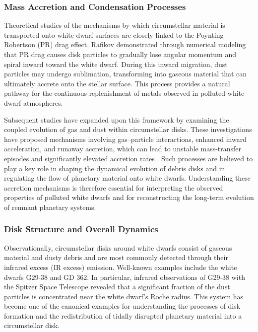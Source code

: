 \subsubsection{Mass Accretion and Condensation Processes}

Theoretical studies of the mechanisms by which circumstellar material is transported onto white dwarf surfaces are closely linked to the Poynting--Robertson (PR) drag effect. Rafikov \cite{rafikov2011} demonstrated through numerical modeling that PR drag causes disk particles to gradually lose angular momentum and spiral inward toward the white dwarf. During this inward migration, dust particles may undergo sublimation, transforming into gaseous material that can ultimately accrete onto the stellar surface. This process provides a natural pathway for the continuous replenishment of metals observed in polluted white dwarf atmospheres.

Subsequent studies have expanded upon this framework by examining the coupled evolution of gas and dust within circumstellar disks. These investigations have proposed mechanisms involving gas--particle interactions, enhanced inward acceleration, and runaway accretion, which can lead to unstable mass-transfer episodes and significantly elevated accretion rates \cite{rafikov2011}. Such processes are believed to play a key role in shaping the dynamical evolution of debris disks and in regulating the flow of planetary material onto white dwarfs. Understanding these accretion mechanisms is therefore essential for interpreting the observed properties of polluted white dwarfs and for reconstructing the long-term evolution of remnant planetary systems.

\subsubsection{Disk Structure and Overall Dynamics}

Observationally, circumstellar disks around white dwarfs consist of gaseous material and dusty debris and are most commonly detected through their infrared excess (IR excess) emission. Well-known examples include the white dwarfs G29-38 and GD 362. In particular, infrared observations of G29-38 with the Spitzer Space Telescope revealed that a significant fraction of the dust particles is concentrated near the white dwarf's Roche radius. This system has become one of the canonical examples for understanding the processes of disk formation and the redistribution of tidally disrupted planetary material into a circumstellar disk.

